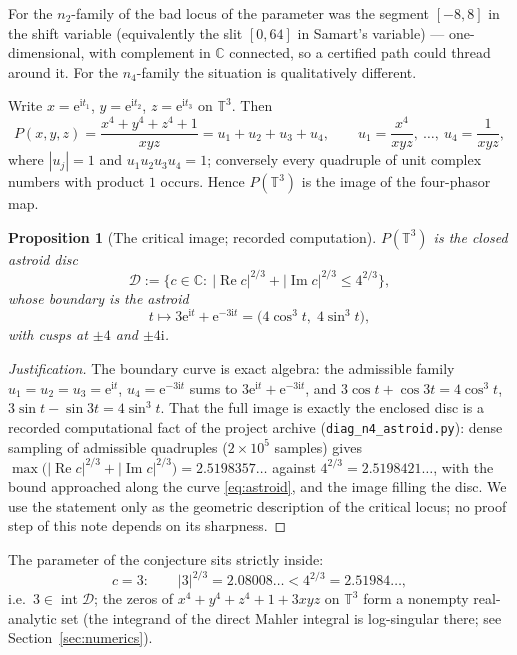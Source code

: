 \documentclass[11pt]{article}
\newtheorem{proposition}[theorem]{Proposition}
\theoremstyle{definition}
\theoremstyle{remark}
\newcommand{\Cc}{\mathbb{C}}
\newcommand{\Tt}{\mathbb{T}}
\newcommand{\ii}{\mathrm{i}}
\newcommand{\e}{\mathrm{e}}
\newcommand{\ImT}{\operatorname{Im}}
\newcommand{\ReT}{\operatorname{Re}}
\begin{document}
For the $n_2$-family of \cite{Zf} the bad locus of the parameter was the
segment $[-8,8]$ in the shift variable (equivalently the slit $[0,64]$
in Samart's variable) --- one-dimensional, with complement in $\Cc$
connected, so a certified path could thread around it. For the
$n_4$-family the situation is qualitatively different.

Write $x=\e^{\ii t_1}$, $y=\e^{\ii t_2}$, $z=\e^{\ii t_3}$ on $\Tt^3$.
Then
\begin{equation}\label{eq:phasors}
  P(x,y,z)=\frac{x^4+y^4+z^4+1}{xyz}=u_1+u_2+u_3+u_4,
  \qquad u_1=\frac{x^4}{xyz},\ \dots,\ u_4=\frac1{xyz},
\end{equation}
where $|u_j|=1$ and $u_1u_2u_3u_4=1$; conversely every quadruple of unit
complex numbers with product $1$ occurs. Hence $P(\Tt^3)$ is the image
of the four-phasor map.

\begin{proposition}[The critical image; recorded computation]\label{prop:astroid}
$P(\Tt^3)$ is the closed \emph{astroid disc}
\begin{equation}\label{eq:astroiddisc}
  \mathcal D:=\bigl\{c\in\Cc:\ |{\ReT c}|^{2/3}+|{\ImT c}|^{2/3}
  \le4^{2/3}\bigr\},
\end{equation}
whose boundary is the astroid
\begin{equation}\label{eq:astroid}
  t\longmapsto 3\e^{\ii t}+\e^{-3\ii t}
  =\bigl(4\cos^3t,\;4\sin^3t\bigr),
\end{equation}
with cusps at $\pm4$ and $\pm4\ii$.
\end{proposition}
\begin{proof}[Justification]
The boundary curve is exact algebra: the admissible family
$u_1=u_2=u_3=\e^{\ii t}$, $u_4=\e^{-3\ii t}$ sums to
$3\e^{\ii t}+\e^{-3\ii t}$, and
$3\cos t+\cos3t=4\cos^3t$, $3\sin t-\sin3t=4\sin^3t$. That the full
image is exactly the enclosed disc is a recorded computational fact of
the project archive (\texttt{diag\_n4\_astroid.py}): dense sampling of
admissible quadruples ($2\times10^5$ samples) gives
$\max\bigl(|{\ReT c}|^{2/3}+|{\ImT c}|^{2/3}\bigr)=2.5198357\ldots$
against $4^{2/3}=2.5198421\ldots$, with the bound approached along the
curve \eqref{eq:astroid}, and the image filling the disc. We use the
statement only as the geometric description of the critical locus; no
proof step of this note depends on its sharpness.
\end{proof}

The parameter of the conjecture sits strictly inside:
\begin{equation}\label{eq:c3inside}
  c=3:\qquad |3|^{2/3}=2.08008\ldots<4^{2/3}=2.51984\ldots,
\end{equation}
i.e.\ $3\in\operatorname{int}\mathcal D$; the zeros of
$x^4+y^4+z^4+1+3xyz$ on $\Tt^3$ form a nonempty real-analytic set (the
integrand of the direct Mahler integral is log-singular there; see
Section~\ref{sec:numerics}).
\end{document}
